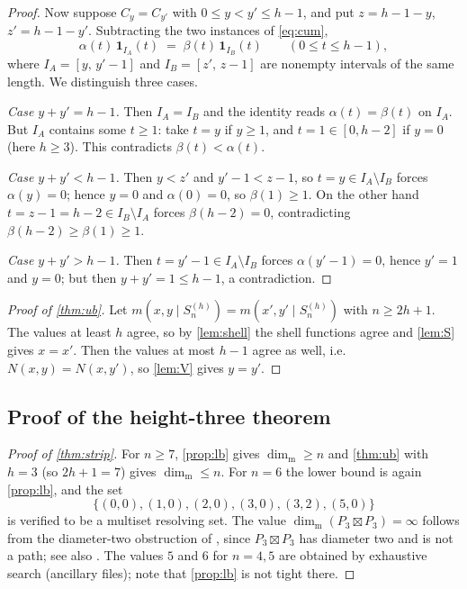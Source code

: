 \documentclass[11pt]{amsart}
\theoremstyle{remark}
\newcommand{\mdim}{\operatorname{dim}_{\mathrm m}}
\begin{document}
\begin{proof}
Now suppose $C_y=C_{y'}$ with $0\le y<y'\le h-1$, and put $z=h-1-y$, $z'=h-1-y'$.  Subtracting the two instances of \eqref{eq:cum},
\[
 \alpha(t)\,\mathbf 1_{I_A}(t)\;=\;\beta(t)\,\mathbf 1_{I_B}(t)
 \qquad(0\le t\le h-1),
\]
where $I_A=[y,\,y'-1]$ and $I_B=[z',\,z-1]$ are nonempty intervals of the same length.  We distinguish three cases.

\emph{Case $y+y'=h-1$.}  Then $I_A=I_B$ and the identity reads $\alpha(t)=\beta(t)$ on $I_A$.  But $I_A$ contains some $t\ge 1$: take $t=y$ if $y\ge 1$, and $t=1\in[0,h-2]$ if $y=0$ (here $h\ge 3$).  This contradicts $\beta(t)<\alpha(t)$.

\emph{Case $y+y'<h-1$.}  Then $y<z'$ and $y'-1<z-1$, so $t=y\in I_A\setminus I_B$ forces $\alpha(y)=0$; hence $y=0$ and $\alpha(0)=0$, so $\beta(1)\ge 1$.  On the other hand $t=z-1=h-2\in I_B\setminus I_A$ forces $\beta(h-2)=0$, contradicting $\beta(h-2)\ge\beta(1)\ge 1$.

\emph{Case $y+y'>h-1$.}  Then $t=y'-1\in I_A\setminus I_B$ forces $\alpha(y'-1)=0$, hence $y'=1$ and $y=0$; but then $y+y'=1\le h-1$, a contradiction.
\end{proof}

\begin{proof}[Proof of \cref{thm:ub}]
Let $m(x,y\mid S^{(h)}_n)=m(x',y'\mid S^{(h)}_n)$ with $n\ge 2h+1$.  The values at least $h$ agree, so by \cref{lem:shell} the shell functions agree and \cref{lem:S} gives $x=x'$.  Then the values at most $h-1$ agree as well, i.e.\ $N(x,y)=N(x,y')$, so \cref{lem:V} gives $y=y'$.
\end{proof}

\subsection{Proof of the height-three theorem}

\begin{proof}[Proof of \cref{thm:strip}]
For $n\ge 7$, \cref{prop:lb} gives $\mdim\ge n$ and \cref{thm:ub} with $h=3$ (so $2h+1=7$) gives $\mdim\le n$.  For $n=6$ the lower bound is again \cref{prop:lb}, and the set
\[
 \{(0,0),(1,0),(2,0),(3,0),(3,2),(5,0)\}
\]
is verified to be a multiset resolving set.  The value $\mdim(P_3\boxtimes P_3)=\infty$ follows from the diameter-two obstruction of \cite[Theorem~3.1]{SimanjuntakEtAl}, since $P_3\boxtimes P_3$ has diameter two and is not a path; see also \cite{HakanenYero2024}.  The values $5$ and $6$ for $n=4,5$ are obtained by exhaustive search (ancillary files); note that \cref{prop:lb} is not tight there.
\end{proof}
\end{document}
